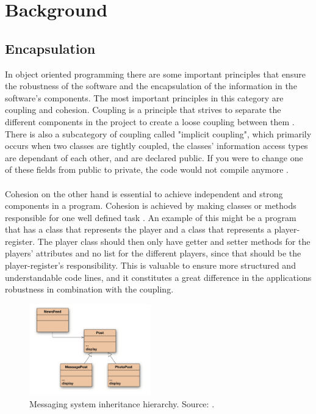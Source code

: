 \documentclass[British]{article}
\begin{document}
\section{Background}

\subsection{Encapsulation}
In object oriented programming there are some important principles that ensure the robustness of the software and the encapsulation of the information in the software's components. The most important principles in this category are coupling and cohesion. Coupling is a principle that strives to separate the different components in the project to create a loose coupling between them \cite[p.~266]{barnes2017objects}. There is also a subcategory of coupling called "implicit coupling", which primarily occurs when two classes are tightly coupled, the classes' information access types are dependant of each other, and are declared public. If you were to change one of these fields from public to private, the code would not compile anymore \cite[p.~274]{barnes2017objects}. 
\\\\
Cohesion on the other hand is essential to achieve independent and strong components in a program. Cohesion is achieved by making classes or methods responsible for one well defined task \cite[p.~278]{barnes2017objects}. An example of this might be a program that has a class that represents the player and a class that represents a player-register. The player class should then only have getter and setter methods for the players' attributes and no list for the different players, since that should be the player-register's responsibility. This is valuable to ensure more structured and understandable code lines, and it constitutes a great difference in the applications robustness in combination with the coupling. 

\newpage

\begin{figure}
\begin{center}
      \includegraphics[width=0.47\textwidth]{figures/post_system.png} 
   \caption{
Messaging system inheritance hierarchy. Source: \cite[p.~368]{barnes2017objects}.
}
\end{center}
\end{figure}
\end{document}
